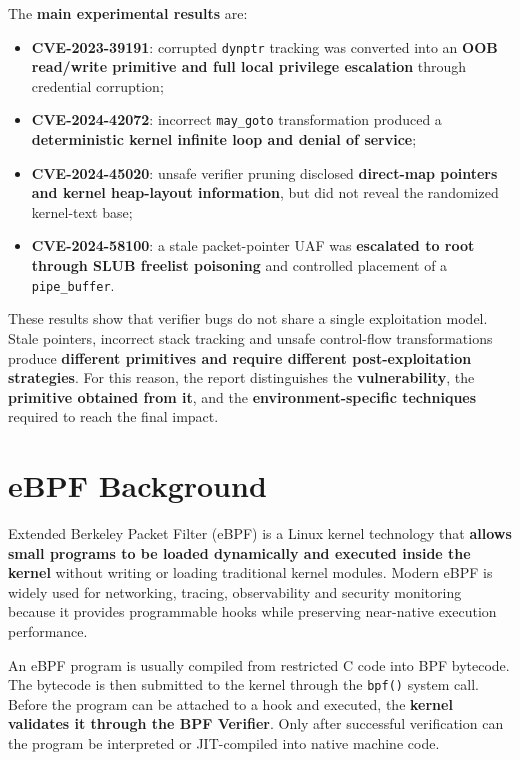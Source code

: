 \documentclass{report}
\begin{document}
    The \textbf{main experimental results} are:

    \begin{itemize}
        \item \textbf{CVE-2023-39191}: corrupted \texttt{dynptr} tracking was converted into an \textbf{OOB read/write primitive and full local privilege escalation} through credential corruption;
        \item \textbf{CVE-2024-42072}: incorrect \texttt{may\_goto} transformation produced a \textbf{deterministic kernel infinite loop and denial of service};
        \item \textbf{CVE-2024-45020}: unsafe verifier pruning disclosed \textbf{direct-map pointers and kernel heap-layout information}, but did not reveal the randomized kernel-text base;
        \item \textbf{CVE-2024-58100}: a stale packet-pointer UAF was \textbf{escalated to root through SLUB freelist poisoning} and controlled placement of a \texttt{pipe\_buffer}.
    \end{itemize}

    These results show that verifier bugs do not share a single exploitation model. Stale pointers, incorrect stack tracking and unsafe control-flow transformations produce \textbf{different primitives and require different post-exploitation strategies}. For this reason, the report distinguishes the \textbf{vulnerability}, the \textbf{primitive obtained from it}, and the \textbf{environment-specific techniques} required to reach the final impact.

    \section{eBPF Background}

    Extended Berkeley Packet Filter (eBPF) is a Linux kernel technology that \textbf{allows small programs to be loaded dynamically and executed inside the kernel} without writing or loading traditional kernel modules. Modern eBPF is widely used for networking, tracing, observability and security monitoring because it provides programmable hooks while preserving near-native execution performance.

    An eBPF program is usually compiled from restricted C code into BPF bytecode. The bytecode is then submitted to the kernel through the \texttt{bpf()} system call. Before the program can be attached to a hook and executed, the \textbf{kernel validates it through the BPF Verifier}. Only after successful verification can the program be interpreted or JIT-compiled into native machine code.
\end{document}
